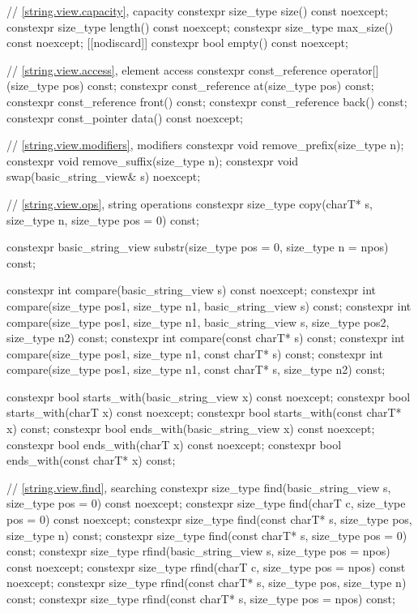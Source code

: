 \begin{codeblock}
{  // \ref{string.view.capacity}, capacity
  constexpr size_type size() const noexcept;
  constexpr size_type length() const noexcept;
  constexpr size_type max_size() const noexcept;
  [[nodiscard]] constexpr bool empty() const noexcept;

  // \ref{string.view.access}, element access
  constexpr const_reference operator[](size_type pos) const;
  constexpr const_reference at(size_type pos) const;
  constexpr const_reference front() const;
  constexpr const_reference back() const;
  constexpr const_pointer data() const noexcept;

  // \ref{string.view.modifiers}, modifiers
  constexpr void remove_prefix(size_type n);
  constexpr void remove_suffix(size_type n);
  constexpr void swap(basic_string_view& s) noexcept;

  // \ref{string.view.ops}, string operations
  constexpr size_type copy(charT* s, size_type n, size_type pos = 0) const;

  constexpr basic_string_view substr(size_type pos = 0, size_type n = npos) const;

  constexpr int compare(basic_string_view s) const noexcept;
  constexpr int compare(size_type pos1, size_type n1, basic_string_view s) const;
  constexpr int compare(size_type pos1, size_type n1, basic_string_view s,
                        size_type pos2, size_type n2) const;
  constexpr int compare(const charT* s) const;
  constexpr int compare(size_type pos1, size_type n1, const charT* s) const;
  constexpr int compare(size_type pos1, size_type n1, const charT* s, size_type n2) const;

  constexpr bool starts_with(basic_string_view x) const noexcept;
  constexpr bool starts_with(charT x) const noexcept;
  constexpr bool starts_with(const charT* x) const;
  constexpr bool ends_with(basic_string_view x) const noexcept;
  constexpr bool ends_with(charT x) const noexcept;
  constexpr bool ends_with(const charT* x) const;

  // \ref{string.view.find}, searching
  constexpr size_type find(basic_string_view s, size_type pos = 0) const noexcept;
  constexpr size_type find(charT c, size_type pos = 0) const noexcept;
  constexpr size_type find(const charT* s, size_type pos, size_type n) const;
  constexpr size_type find(const charT* s, size_type pos = 0) const;
  constexpr size_type rfind(basic_string_view s, size_type pos = npos) const noexcept;
  constexpr size_type rfind(charT c, size_type pos = npos) const noexcept;
  constexpr size_type rfind(const charT* s, size_type pos, size_type n) const;
  constexpr size_type rfind(const charT* s, size_type pos = npos) const;

}
\end{codeblock}
